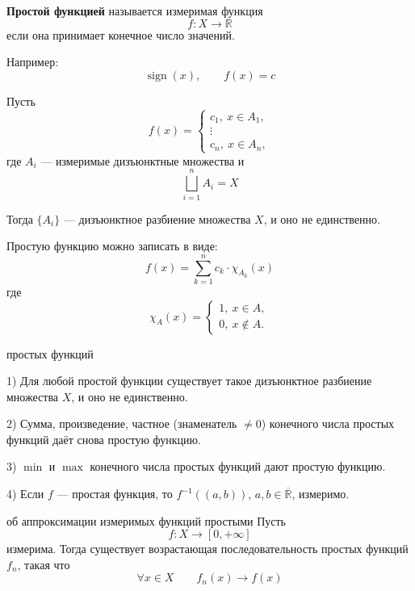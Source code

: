 \documentclass[12pt,a4paper]{article}
\begin{document}
\begin{definition}
    \textbf{Простой функцией} называется измеримая функция
    \[
        f:X\to\mathbb{R}
    \]
    если она принимает конечное число значений.

    Например:
    \[
        \operatorname{sign}(x),\qquad f(x)=c
    \]

    Пусть
    \[
        f(x)=
        \begin{cases}
            c_1,\ x\in A_1,\\
            \vdots\\
            c_n,\ x\in A_n,
        \end{cases}
    \]
    где $A_i$ — измеримые дизъюнктные множества и
    \[
        \bigsqcup_{i=1}^{n}A_i=X
    \]

    Тогда $\{A_i\}$ — дизъюнктное разбиение множества $X$, и оно не единственно.
\end{definition}

Простую функцию можно записать в виде:
\[
    f(x)=\sum_{k=1}^{n}c_k\cdot\chi_{A_k}(x)
\]
где
\[
    \chi_{A}(x)=
    \begin{cases}
        1,\ x\in A,\\
        0,\ x\notin A.
    \end{cases}
\]

\begin{props}{простых функций}

    1) Для любой простой функции существует такое дизъюнктное разбиение множества $X$, и оно не единственно.

    2) Сумма, произведение, частное (знаменатель $\neq0$) конечного числа простых функций даёт снова простую функцию.

    3) $\min$ и $\max$ конечного числа простых функций дают простую функцию.

    4) Если $f$ — простая функция, то $f^{-1}((a,b))$, $a,b\in\overline{\mathbb{R}}$, измеримо.

\end{props}

\begin{theorem}{об аппроксимации измеримых функций простыми}
    Пусть
    \[
        f:X\to[0,+\infty]
    \]
    измерима. Тогда существует возрастающая последовательность простых функций $f_n$, такая что
    \[
        \forall x\in X\qquad f_n(x)\to f(x)
    \]
\end{theorem}
\end{document}
